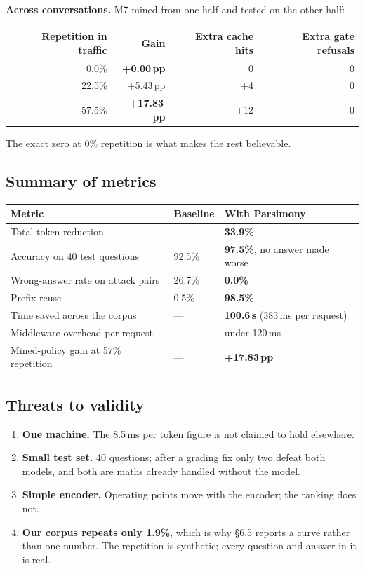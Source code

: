 \documentclass[11pt,a4paper]{article}
\begin{document}
\textbf{Across conversations.} M7 mined from one half and tested on the other half:

\begin{center}
\begin{tabular}{@{}rrrr@{}}
\toprule
\textbf{Repetition in traffic} & \textbf{Gain} & \textbf{Extra cache hits} & \textbf{Extra gate refusals} \\
\midrule
0.0\%  & \textbf{+0.00\,pp}  & 0 & 0 \\
22.5\% & +5.43\,pp  & +4 & 0 \\
57.5\% & \textbf{+17.83\,pp} & +12 & 0 \\
\bottomrule
\end{tabular}
\end{center}

The exact zero at 0\% repetition is what makes the rest believable.

\subsection{Summary of metrics}
\begin{center}
\begin{tabularx}{\textwidth}{@{}X ll@{}}
\toprule
\textbf{Metric} & \textbf{Baseline} & \textbf{With Parsimony} \\
\midrule
Total token reduction & --- & \textbf{33.9\%} \\
Accuracy on 40 test questions & 92.5\% & \textbf{97.5\%}, no answer made worse \\
Wrong-answer rate on attack pairs & 26.7\% & \textbf{0.0\%} \\
Prefix reuse & 0.5\% & \textbf{98.5\%} \\
Time saved across the corpus & --- & \textbf{100.6\,s} (383\,ms per request) \\
Middleware overhead per request & --- & under 120\,ms \\
Mined-policy gain at 57\% repetition & --- & \textbf{+17.83\,pp} \\
\bottomrule
\end{tabularx}
\end{center}

\subsection{Threats to validity}
\begin{enumerate}
\item \textbf{One machine.} The 8.5\,ms per token figure is not claimed to hold elsewhere.
\item \textbf{Small test set.} 40 questions; after a grading fix only two defeat both models, and both are maths already handled without the model.
\item \textbf{Simple encoder.} Operating points move with the encoder; the ranking does not.
\item \textbf{Our corpus repeats only 1.9\%}, which is why \S6.5 reports a curve rather than one number. The repetition is synthetic; every question and answer in it is real.
\end{enumerate}
\end{document}
